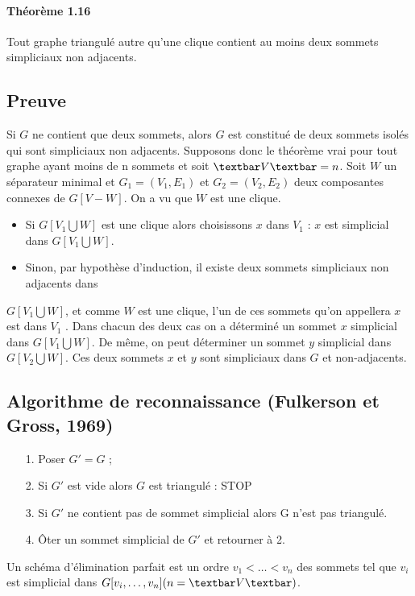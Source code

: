 \paragraph*{Théorème 1.16}
Tout graphe triangulé autre qu'une clique contient au moins deux sommets simpliciaux
non adjacents.

\subsection*{Preuve}
Si $ G $ ne contient que deux sommets, alors $ G $ est constitué de deux sommets isolés qui
sont simpliciaux non adjacents. Supposons donc le théorème vrai pour tout graphe ayant
moins de n sommets et soit $ \textbar V \textbar = n $. Soit $ W $ un séparateur minimal et $ G_{1 }= (V_{1} , E_{1}) $
et $ G_{2} = (V_{2}, E_{2} )$ deux composantes connexes de $ G[V - W ] $. On a vu que $ W $ est une clique.
\begin{itemize}
\item Si $ G[V_{1} \bigcup W ] $ est une clique alors choisissons $ x $ dans $ V_{1} $ : $ x $ est simplicial dans $ G[V_{1} \bigcup W ] $.
\item Sinon, par hypothèse d'induction, il existe deux sommets simpliciaux non adjacents dans
\end{itemize}
$ G[V_{1} \bigcup W ] $, et comme $ W $ est une clique, l'un de ces sommets qu'on appellera $ x $ est
dans $ V_{1} $ .
Dans chacun des deux cas on a déterminé un sommet $ x $ simplicial dans $ G[V_{1} \bigcup W ] $. De
même, on peut déterminer un sommet $ y $ simplicial dans $ G[V_{2} \bigcup W ] $. Ces deux sommets $ x $
et $ y $ sont simpliciaux dans $ G $ et non-adjacents.

\subsection*{Algorithme de reconnaissance (Fulkerson et Gross, 1969)}
\begin{itemize}
	\item[1.] Poser $ G' = G $ ;
\item[2.] Si $ G' $ est vide alors $ G $ est triangulé : STOP
\item[3.] Si $ G' $ ne contient pas de sommet simplicial alors G n'est pas triangulé.
\item[4.] Ôter un sommet simplicial de $ G' $ et retourner à 2.
\end{itemize}

Un schéma d'élimination parfait est un ordre $ v_{1} < \dots < v_{n} $ des sommets tel que $ v_{i} $ est
simplicial dans $ G[v_{i} , \dots , v_{n} ] (n = \textbar V \textbar) $.

